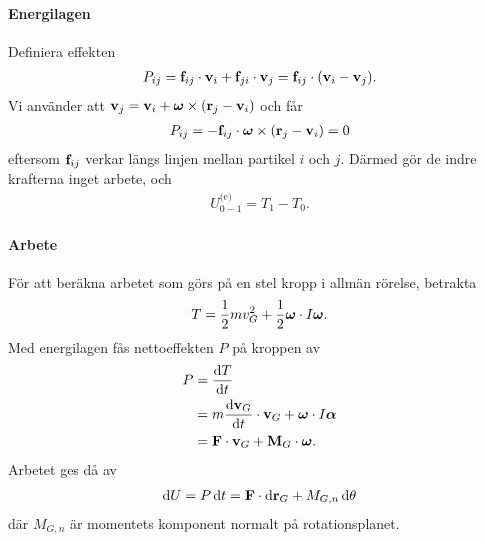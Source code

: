 \paragraph{Energilagen}
Definiera effekten
\begin{align*}
	P_{ij} = \vb{f}_{ij}\cdot\vb{v}_{i} + \vb{f}_{ji}\cdot\vb{v}_{j} = \vb{f}_{ij}\cdot(\vb{v}_{i} - \vb{v}_{j}).
\end{align*}
Vi använder att $\vb{v}_{j} = \vb{v}_{i} + \vb*{\omega}\times(\vb{r}_{j} - \vb{v}_{i})$ och får
\begin{align*}
	P_{ij} = -\vb{f}_{ij}\cdot\vb*{\omega}\times(\vb{r}_{j} - \vb{v}_{i}) = 0
\end{align*}
eftersom $\vb{f}_{ij}$ verkar längs linjen mellan partikel $i$ och $j$. Därmed gör de indre krafterna inget arbete, och
\begin{align*}
	U_{0 - 1}^{\text{(e)}} = T_{1} - T_{0}.
\end{align*}

\paragraph{Arbete}
För att beräkna arbetet som görs på en stel kropp i allmän rörelse, betrakta
\begin{align*}
	T = \frac{1}{2}mv_{G}^{2} + \frac{1}{2}\vb*{\omega}\cdot I\vb*{\omega}.
\end{align*}
Med energilagen fås nettoeffekten $P$ på kroppen av
\begin{align*}
	P &= \dv{T}{t} \\
	  &= m\dv{\vb{v}_{G}}{t}\cdot\vb{v}_{G} + \vb*{\omega}\cdot I\vb*{\alpha} \\
	  &= \vb{F}\cdot\vb{v}_{G} + \vb{M}_{G}\cdot\vb*{\omega}.
\end{align*}
Arbetet ges då av
\begin{align*}
	\dd{U} = P\dd{t} = \vb{F}\cdot\dd{\vb{r}_{G}} + M_{G, n}\dd{\theta}
\end{align*}
där $M_{G, n}$ är momentets komponent normalt på rotationsplanet.

